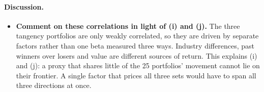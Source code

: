 \paragraph{Discussion.}
\begin{itemize}
\setlength{\itemsep}{4pt}\setlength{\parskip}{0pt}

\item \textbf{Comment on these correlations in light of (i) and (j).} The
three tangency portfolios are only weakly correlated, so they are driven by
separate factors rather than one beta measured three ways. Industry
differences, past winners over losers and value are different sources of
return. This explains (i) and (j): a proxy that shares little of the 25 portfolios' movement cannot lie on their frontier. A single factor
that prices all three sets would have to span all three directions at once.

\end{itemize}
